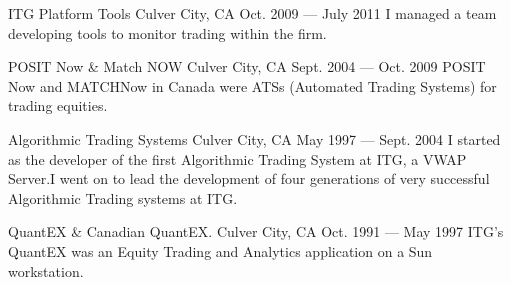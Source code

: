 \begin{cventries}

    {ITG Platform Tools} %
    {Culver City, CA} %
    {Oct. 2009 --- July 2011} %
    {I managed a team developing tools to monitor trading within the firm.}

    {POSIT Now \& Match NOW} %
    {Culver City, CA} %
    {Sept. 2004 --- Oct. 2009} %
    {POSIT Now and MATCHNow in Canada were ATSs (Automated Trading Systems)
for trading equities.}

    {Algorithmic Trading Systems} %
    {Culver City, CA} %
    {May 1997 --- Sept. 2004} %
    {I started as the developer of the first Algorithmic Trading System at
ITG, a VWAP Server.\@ I went on to lead the development of
four generations of very successful Algorithmic Trading systems at ITG.}

    {QuantEX \& Canadian QuantEX.} %
    {Culver City, CA} %
    {Oct. 1991 --- May 1997} %
    {ITG's QuantEX was an Equity Trading and Analytics application on a Sun
workstation.}

\end{cventries}







